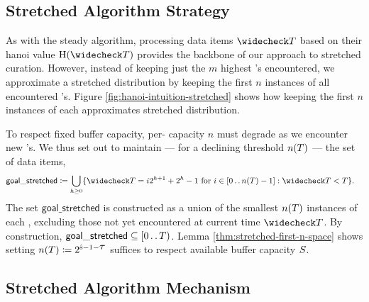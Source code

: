 
\subsection{Stretched Algorithm Strategy}
\label{sec:stretched-strategy}

As with the steady algorithm, processing data items $\colorTbar$ based on their hanoi value $\colorH(\colorTbar)$ provides the backbone of our approach to stretched curation.
However, instead of keeping just the $m$ highest \hv{}'s encountered, we approximate a stretched distribution by keeping the first $n$ instances of all encountered \hv{}'s.
Figure \ref{fig:hanoi-intuition-stretched} shows how keeping the first $n$ instances of each \hv{} approximates stretched distribution.

To respect fixed buffer capacity, per-\hv{} capacity $n$ must degrade as we encounter new \hv{}'s.
We thus set out to maintain --- for a declining threshold $n(\colorT)$ --- the set of data items,
\begin{align*}
\mathsf{goal\_stretched}
&\coloneq
\bigcup_{\colorh \geq 0}
\{ \colorTbar = i2^{\colorh + 1} + 2^{\colorh} - 1 \text{ for } i \in [0 \twodots n(\colorT) - 1] : \colorTbar < \colorT \}.
\end{align*}
The set $\mathsf{goal\_stretched}$ is constructed as a union of the smallest $n(\colorT)$ instances of each \hv{}, excluding those not yet encountered at current time $\colorTbar$.
By construction, $\mathsf{goal\_stretched} \subseteq [0 \twodots \colorT)$.
Lemma \ref{thm:stretched-first-n-space} shows setting $n(\colorT) \coloneq 2^{\colors - 1 - \colortau}$ suffices to respect available buffer capacity $\colorS$.


\FloatBarrier  %


\subsection{Stretched Algorithm Mechanism}
\label{sec:stretched-mechanism}

